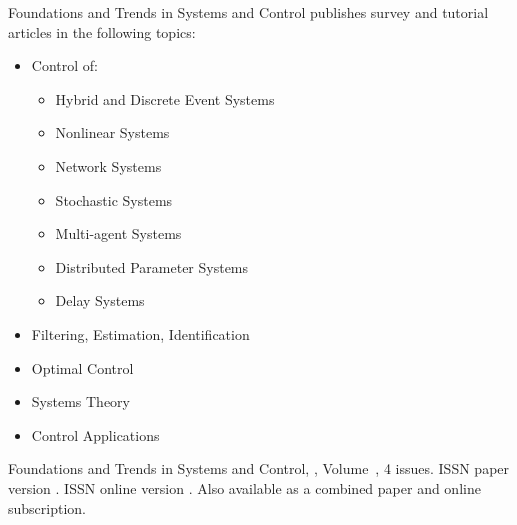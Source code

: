 


\journalaimsandscope
 {%
 Foundations and Trends\textsuperscript{\textregistered} in
Systems and Control publishes
 survey and tutorial articles in the following topics:
 \begin{multicols}{2}\raggedcolumns
 \begin{itemize}
\item{Control of:}
	\begin{itemize}
	\item{Hybrid and Discrete Event Systems}
	\item{Nonlinear Systems}
	\item{Network Systems}
	\item{Stochastic Systems}
	\item{Multi-agent Systems}
	\item{Distributed Parameter Systems}
	\item{Delay Systems}
	\end{itemize}
\item{Filtering, Estimation, Identification}
\item{Optimal Control}
\item{Systems Theory}
\item{Control Applications}
\end{itemize}
 \end{multicols}
 }


\journallibraryinfo
 {%
  Foundations and Trends\textsuperscript{\textregistered} in
  Systems and Control, ,
  Volume~, 4 issues.
  ISSN paper version .
  ISSN online version .
  Also available as a combined paper and online
  subscription.
 } 